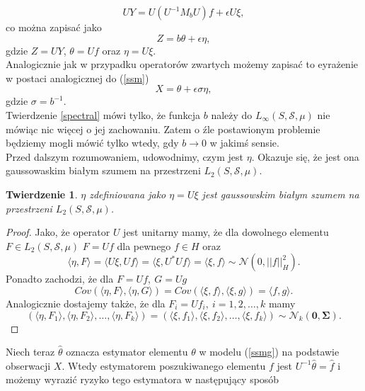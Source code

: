 \documentclass{article}
\newtheorem{tw}{Twierdzenie}
\begin{document}
\begin{displaymath}
UY=U(U^{-1}M_bU)f+\epsilon U\xi,
\end{displaymath}
co można zapisać jako
\begin{displaymath}
Z=b\theta+\epsilon \eta,
\end{displaymath}
gdzie $Z=UY$, $\theta =Uf$ oraz $\eta =U\xi$.\\
Analogicznie jak w przypadku operatorów zwartych możemy zapisać to eyrażenie w postaci analogicznej do (\ref{ssm})\begin{equation}\label{ssmg}
X=\theta +\epsilon\sigma\eta,
\end{equation}
gdzie $\sigma=b^{-1}$.\\
Twierdzenie \ref{spectral} mówi tylko, że funkcja $b$ należy do $ L_{\infty}(S,\mathcal{S},\mu )$ nie mówiąc nic więcej o jej zachowaniu. Zatem o źle postawionym problemie będziemy mogli mówić tylko wtedy, gdy $b\to 0$ w jakimś sensie.\\
Przed dalszym rozumowaniem, udowodnimy, czym jest $\eta$. Okazuje się, że jest ona gaussowaskim białym szumem na przestrzeni $L_2(S,\mathcal{S},\mu )$.
\begin{tw}
$\eta$ zdefiniowana jako $\eta=U\xi$ jest gaussowskim białym szumem na przestrzeni $L_2(S,\mathcal{S},\mu )$.
\end{tw}
\begin{proof}
Jako, że operator $U$ jest unitarny mamy, że dla dowolnego elementu $F\in L_2(S,\mathcal{S},\mu )$ $F=Uf$ dla pewnego $ f\in H$ oraz
\begin{displaymath}
\langle \eta, F\rangle =\langle U\xi , Uf\rangle =\langle \xi, U^*U f\rangle =\langle \xi, f\rangle \sim \mathcal{N}(0,||f||_H^2).
\end{displaymath}
Ponadto zachodzi, że dla $F=Uf,\ G=Ug$
\begin{displaymath}
Cov\left(\langle \eta, F\rangle , \langle \eta , G\rangle\right)=Cov\left( \langle \xi, f\rangle , \langle \xi , g\rangle\right)=\langle f,g\rangle.
\end{displaymath}
Analogicznie dostajemy także, że dla $F_i=Uf_i,\ i=1,2,\dots,k$ mamy
\begin{displaymath}
\left( \langle \eta, F_1 \rangle ,\langle \eta, F_2 \rangle ,\dots ,\langle \eta, F_k \rangle\right)=\left(\langle \xi,f_1 \rangle , \langle \xi,f_2 \rangle ,\dots ,\langle \xi,f_k \rangle	\right)\sim \mathcal{N}_k(\pmb{0},\pmb{\Sigma}).
\end{displaymath}
\end{proof}
Niech teraz $\hat{\theta}$ oznacza estymator elementu $\theta$ w modelu (\ref{ssmg}) na podstawie obserwacji $X$. Wtedy estymatorem poszukiwanego elementu $f$ jest $U^{-1}\hat{\theta}=\hat{f}$ i możemy wyrazić ryzyko tego estymatora w następujący sposób
\end{document}
